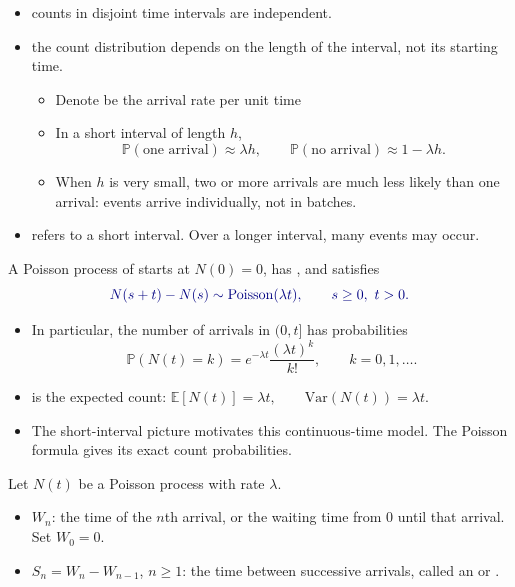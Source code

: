 \documentclass[8pt,a4paper,landscape]{extarticle}
\begin{document}
\begin{cscolumns}
\begin{itemize}
\item {} counts in disjoint time intervals are independent.
\item {} the count distribution depends on the length of the interval, not its starting time.
\begin{itemize}
\item Denote  be the arrival rate per unit time
\item In a short interval of length $h$,
\[ \mathbb{P}(\text{one arrival})\approx\lambda h, \qquad \mathbb{P}(\text{no arrival})\approx 1-\lambda h. \]
\item When $h$ is very small, two or more arrivals are much less likely than one arrival: events arrive individually, not in batches.
\end{itemize}
\item {} refers to a short interval. Over a longer interval, many events may occur.
\end{itemize}

\begin{definition}
A Poisson process of  starts at $N(0)=0$, has , and satisfies
\[ {\color{csBlue}N(s+t)-N(s)\sim\mathrm{Poisson}(\lambda t),\qquad s\ge 0,\ t>0.} \]
\end{definition}

\begin{itemize}
\item In particular, the number of arrivals in $(0,t]$ has probabilities
\[ \mathbb{P}(N(t)=k)=e^{-\lambda t}\frac{(\lambda t)^k}{k!},\qquad k=0,1,\ldots. \]
\item {} is the expected count: $\mathbb{E}[N(t)]=\lambda t, \qquad \mathrm{Var}(N(t))=\lambda t.$
\item The short-interval picture motivates this continuous-time model. The Poisson formula gives its exact count probabilities.
\end{itemize}

\begin{definition}
Let $N(t)$ be a Poisson process with rate $\lambda$.
\begin{itemize}
\item $W_n$: the time of the $n$th arrival, or the waiting time from 0 until that arrival. Set $W_0=0$.
\item $S_n=W_n-W_{n-1}$, $n\ge1$: the time between successive arrivals, called an  or .
\end{itemize}
\end{definition}


\end{cscolumns}
\end{document}
